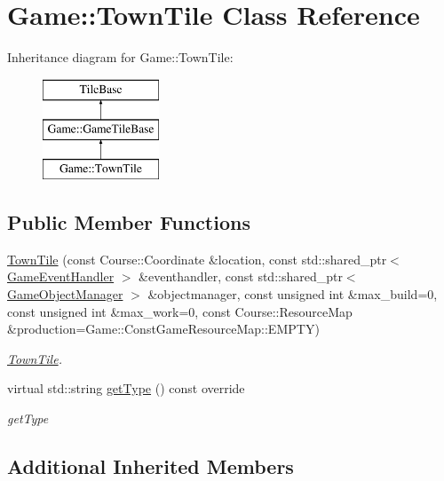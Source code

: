 \hypertarget{class_game_1_1_town_tile}{\section{Game\-:\-:Town\-Tile Class Reference}
\label{class_game_1_1_town_tile}
}
Inheritance diagram for Game\-:\-:Town\-Tile\-:\begin{figure}[H]
\begin{center}
\leavevmode
\includegraphics[height=3.000000cm]{class_game_1_1_town_tile}
\end{center}
\end{figure}
\subsection*{Public Member Functions}
\begin{DoxyCompactItemize}
\item 
\hyperlink{class_game_1_1_town_tile_ac0838f0baf66071b049ac8ee9e7f8090}{Town\-Tile} (const Course\-::\-Coordinate \&location, const std\-::shared\-\_\-ptr$<$ \hyperlink{class_game_1_1_game_event_handler}{Game\-Event\-Handler} $>$ \&eventhandler, const std\-::shared\-\_\-ptr$<$ \hyperlink{class_game_1_1_game_object_manager}{Game\-Object\-Manager} $>$ \&objectmanager, const unsigned int \&max\-\_\-build=0, const unsigned int \&max\-\_\-work=0, const Course\-::\-Resource\-Map \&production=Game\-::\-Const\-Game\-Resource\-Map\-::\-E\-M\-P\-T\-Y)
\begin{DoxyCompactList}\small\item\em \hyperlink{class_game_1_1_town_tile}{Town\-Tile}. \end{DoxyCompactList}\item 
virtual std\-::string \hyperlink{class_game_1_1_town_tile_a12b8efcd1bb6f9ef73f54f3493d5866d}{get\-Type} () const override
\begin{DoxyCompactList}\small\item\em get\-Type \end{DoxyCompactList}\end{DoxyCompactItemize}
\subsection*{Additional Inherited Members}


